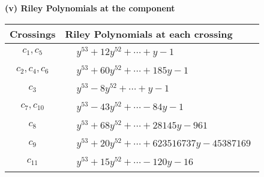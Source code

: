 \documentclass[1p]{elsarticle_modified}
\theoremstyle{definition}
\begin{document}
\newpage\renewcommand{\arraystretch}{1}
\flushleft \textbf{(v) Riley Polynomials at the component}\newline \\
\begin{tabular}{m{50pt}|m{274pt}}
Crossings & \hspace{64pt}Riley Polynomials at each crossing \\
\hline $$\begin{aligned}c_{1},c_{5}\end{aligned}$$&$\begin{aligned}
&y^{53}+12 y^{52}+\cdots+y-1
\end{aligned}$\\
\hline $$\begin{aligned}c_{2},c_{4},c_{6}\end{aligned}$$&$\begin{aligned}
&y^{53}+60 y^{52}+\cdots+185 y-1
\end{aligned}$\\
\hline $$\begin{aligned}c_{3}\end{aligned}$$&$\begin{aligned}
&y^{53}-8 y^{52}+\cdots+y-1
\end{aligned}$\\
\hline $$\begin{aligned}c_{7},c_{10}\end{aligned}$$&$\begin{aligned}
&y^{53}-43 y^{52}+\cdots-84 y-1
\end{aligned}$\\
\hline $$\begin{aligned}c_{8}\end{aligned}$$&$\begin{aligned}
&y^{53}+68 y^{52}+\cdots+28145 y-961
\end{aligned}$\\
\hline $$\begin{aligned}c_{9}\end{aligned}$$&$\begin{aligned}
&y^{53}+20 y^{52}+\cdots+623516737 y-45387169
\end{aligned}$\\
\hline $$\begin{aligned}c_{11}\end{aligned}$$&$\begin{aligned}
&y^{53}+15 y^{52}+\cdots-120 y-16
\end{aligned}$\\
\hline
\end{tabular}\\~\\
\end{document}
